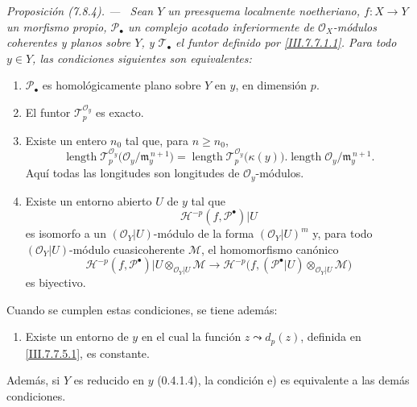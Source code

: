 \documentclass[10pt,oneside]{book}
\newcommand{\kres}{\kappa}
\newcommand{\sref}[2][]{\textup{(#2)}}
\newenvironment{proposition}[1][]{\par\medskip\noindent\itshape Proposición (#1). ---\ }{\par}
\begin{document}
\begin{proposition}[7.8.4]
\label{III.7.8.4}
Sean $Y$ un preesquema localmente noetheriano, $f:X\to Y$ un
morfismo propio, $\mathscr P_\bullet$ un complejo acotado
inferiormente de $\mathscr O_X$-módulos coherentes y planos sobre
$Y$, y $\mathscr T_\bullet$ el funtor definido por
\eqref{III.7.7.1.1}. Para todo $y\in Y$, las condiciones siguientes
son equivalentes:
\begin{enumerate}
  \item[\textup{a)}] $\mathscr P_\bullet$ es homológicamente plano sobre $Y$
    en $y$, en dimensión $p$.
  \item[\textup{b)}] El funtor $\mathscr T_p^{\mathscr O_y}$ es exacto.
  \item[\textup{c)}] Existe un entero $n_0$ tal que, para $n\geq n_0$,
    \[
      \operatorname{length}
        \mathscr T_p^{\mathscr O_y}
          \bigl(\mathscr O_y/\mathfrak m_y^{\,n+1}\bigr)
      =
      \operatorname{length}
        \mathscr T_p^{\mathscr O_y}\bigl(\kres(y)\bigr)
      .
      \operatorname{length}
        \mathscr O_y/\mathfrak m_y^{\,n+1}.
      \tag{7.8.4.1}\label{III.7.8.4.1}
    \]
    Aquí todas las longitudes son longitudes de
    $\mathscr O_y$-módulos.
  \item[\textup{d)}] Existe un entorno abierto $U$ de $y$ tal que
    \[
      \mathcal H^{-p}(f,\mathscr P^\bullet)|U
    \]
    es isomorfo a un $(\mathscr O_Y|U)$-módulo de la forma
    $(\mathscr O_Y|U)^m$ y, para todo $(\mathscr O_Y|U)$-módulo
    cuasicoherente $\mathscr M$, el homomorfismo canónico
    \[
      \mathcal H^{-p}(f,\mathscr P^\bullet)|U
        \otimes_{\mathscr O_Y|U}\mathscr M
      \longrightarrow
      \mathcal H^{-p}
        \bigl(f,(\mathscr P^\bullet|U)
          \otimes_{\mathscr O_Y|U}\mathscr M\bigr)
      \tag{7.8.4.2}\label{III.7.8.4.2}
    \]
    es biyectivo.
\end{enumerate}
Cuando se cumplen estas condiciones, se tiene además:
\begin{enumerate}
  \item[\textup{e)}] Existe un entorno de $y$ en el cual la función
    $z\leadsto d_p(z)$, definida en \eqref{III.7.7.5.1}, es
    constante.
\end{enumerate}
Además, si $Y$ es \textup{reducido} en $y$ \textup{\sref[0]{0.4.1.4}}, la condición
e) es equivalente a las demás condiciones.
\end{proposition}
\end{document}
